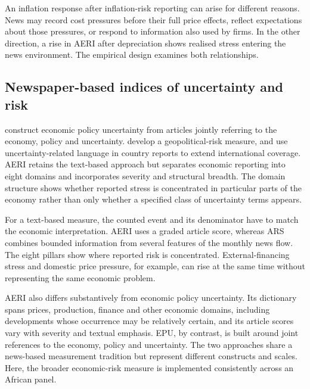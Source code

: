 \documentclass[12pt]{article}
\begin{document}
An inflation response after inflation-risk reporting can arise for different reasons. News may record cost pressures before their full price effects, reflect expectations about those pressures, or respond to information also used by firms. In the other direction, a rise in AERI after depreciation shows realised stress entering the news environment. The empirical design examines both relationships.
\subsection{Newspaper-based indices of uncertainty and risk}
\citet{baker2016} construct economic policy uncertainty from articles jointly referring to the economy, policy and uncertainty. \citet{caldara2022} develop a geopolitical-risk measure, and \citet{ahir2022} use uncertainty-related language in country reports to extend international coverage. AERI retains the text-based approach but separates economic reporting into eight domains and incorporates severity and structural breadth. The domain structure shows whether reported stress is concentrated in particular parts of the economy rather than only whether a specified class of uncertainty terms appears.

For a text-based measure, the counted event and its denominator have to match the economic interpretation. AERI uses a graded article score, whereas ARS combines bounded information from several features of the monthly news flow. The eight pillars show where reported risk is concentrated. External-financing stress and domestic price pressure, for example, can rise at the same time without representing the same economic problem.

AERI also differs substantively from economic policy uncertainty. Its dictionary spans prices, production, finance and other economic domains, including developments whose occurrence may be relatively certain, and its article scores vary with severity and textual emphasis. EPU, by contrast, is built around joint references to the economy, policy and uncertainty. The two approaches share a news-based measurement tradition but represent different constructs and scales. Here, the broader economic-risk measure is implemented consistently across an African panel.
\end{document}
